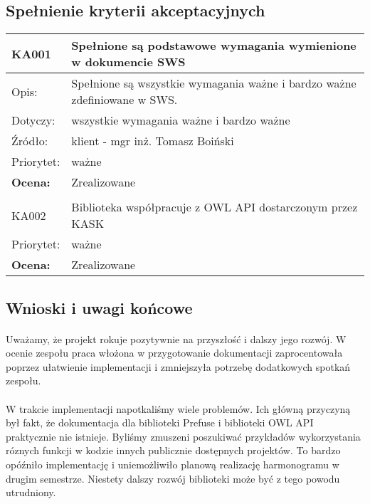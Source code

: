 \subsection{Spełnienie kryterii akceptacyjnych}


\begin{center}

\begin{tabular}{|m{3cm}|m{9cm}|} \hline

KA001 & Spełnione są podstawowe wymagania wymienione w dokumencie SWS \\ \hline
Opis: & Spełnione są wszystkie wymagania ważne i bardzo ważne zdefiniowane w SWS. \\ \hline
Dotyczy: & wszystkie wymagania ważne i bardzo ważne \\ \hline
Źródło: & klient - mgr inż. Tomasz Boiński \\ \hline
Priorytet: & ważne  \\ \hline %
\textbf{Ocena:} & Zrealizowane \\ \hline
\multicolumn{2}{c}{} \\
 \hline

KA002 & Biblioteka współpracuje z OWL API dostarczonym przez KASK \\ \hline
Priorytet: & ważne  \\ \hline %
\textbf{Ocena:} & Zrealizowane \\ \hline
\end{tabular}

\end{center}


\subsection{Wnioski i uwagi końcowe}

\paragraph{} Uważamy, że projekt rokuje pozytywnie na przyszłość i dalszy jego rozwój. W ocenie zespołu praca włożona w przygotowanie dokumentacji zaprocentowała poprzez ułatwienie implementacji i zmniejszyła potrzebę dodatkowych spotkań zespołu. 
\paragraph{} W trakcie implementacji napotkaliśmy wiele problemów. Ich główną przyczyną był fakt, że dokumentacja dla biblioteki Prefuse i biblioteki OWL API praktycznie nie istnieje. Byliśmy zmuszeni poszukiwać przykładów wykorzystania róznych funkcji w kodzie innych publicznie dostępnych projektów. To bardzo opóźniło implementację i uniemożliwiło planową realizację harmonogramu w drugim semestrze. Niestety dalszy rozwój biblioteki może być z tego powodu utrudniony. 
